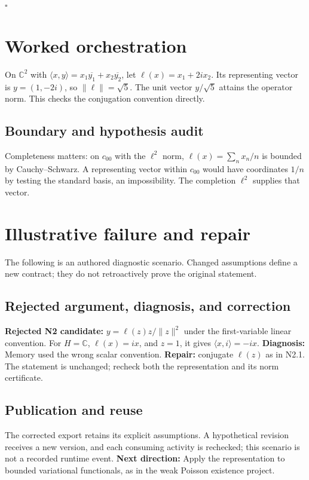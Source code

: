 \documentclass[preprint,12pt,aps,pra,showkeys,amsmath,amssymb,superscriptaddress,floatfix]{revtex4-2}
\theoremstyle{definition}
\theoremstyle{remark}
\begin{document}
\hfill$\square$

\section{Worked orchestration}

On \(\mathbb C^2\) with
\(\langle x,y\rangle=x_1\overline{y_1}+x_2\overline{y_2}\), let
\(\ell(x)=x_1+2i x_2\). Its representing vector is \(y=(1,-2i)\), so
\(\|\ell\|=\sqrt5\). The unit vector \(y/\sqrt5\) attains the operator
norm. This checks the conjugation convention directly.

\subsection{Boundary and hypothesis audit}

Completeness matters: on \(c_{00}\) with the \(\ell^2\) norm,
\(\ell(x)=\sum_n x_n/n\) is bounded by Cauchy--Schwarz. A representing
vector within \(c_{00}\) would have coordinates \(1/n\) by testing the
standard basis, an impossibility. The completion \(\ell^2\) supplies
that vector.

\section{Illustrative failure and repair}

The following is an authored diagnostic scenario. Changed assumptions
define a new contract; they do not retroactively prove the original
statement.

\subsection{Rejected argument, diagnosis, and correction}
\textbf{Rejected N2 candidate:} \(y=\ell(z)z/\|z\|^2\) under the
first-variable linear convention. For \(H=\mathbb C\), \(\ell(x)=ix\),
and \(z=1\), it gives \(\langle x,i\rangle=-ix\). \textbf{Diagnosis:}
Memory used the wrong scalar convention. \textbf{Repair:} conjugate
\(\ell(z)\) as in N2.1. The statement is unchanged; recheck both the
representation and its norm certificate.

\subsection{Publication and reuse}
The corrected export retains its explicit assumptions. A hypothetical
revision receives a new version, and each consuming activity is
rechecked; this scenario is not a recorded runtime event. \textbf{Next
direction:} Apply the representation to bounded variational functionals,
as in the weak Poisson existence project.
\end{document}
